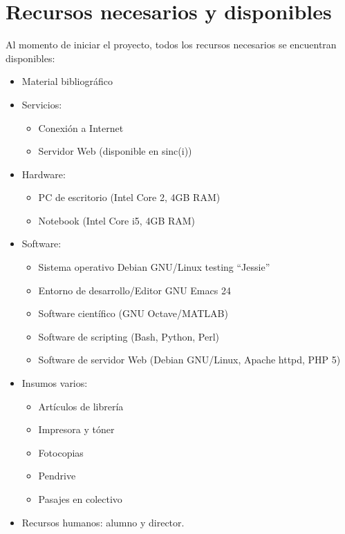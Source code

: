 \documentclass[12pt,bibliography=oldstyle,DIV=12,parskip=half-]{scrreprt}
\begin{document}
\section{Recursos necesarios y disponibles}
Al momento de iniciar el proyecto, todos los recursos necesarios se
encuentran disponibles:
\begin{itemize}
\item Material bibliográfico
\item Servicios:
  \begin{itemize}
  \item Conexión a Internet
  \item Servidor Web (disponible en sinc(i))
  \end{itemize}
\item Hardware:
  \begin{itemize}
  \item PC de escritorio (Intel Core 2, 4GB RAM)
  \item Notebook (Intel Core i5, 4GB RAM)
  \end{itemize}
\item Software:
  \begin{itemize}
  \item Sistema operativo Debian GNU/Linux testing ``Jessie''
  \item Entorno de desarrollo/Editor GNU Emacs 24
  \item Software científico (GNU Octave/MATLAB)
  \item Software de scripting (Bash, Python, Perl)
  \item Software de servidor Web (Debian GNU/Linux, Apache
    httpd, PHP 5)
  \end{itemize}
\item Insumos varios:
  \begin{itemize}
  \item Artículos de librería
  \item Impresora y tóner
  \item Fotocopias
  \item Pendrive
  \item Pasajes en colectivo
  \end{itemize}
\item Recursos humanos: alumno y director.
\end{itemize}
%
%
\end{document}
